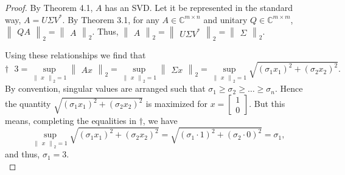 \documentclass{article}
\begin{document}
\begin{proof}
    By Theorem 4.1, $A$ has an SVD. Let it be represented in the standard way, $A = U \Sigma V^*$. By Theorem 3.1, for any $A \in \mathbb{C}^{m \times n}$ and unitary $Q \in \mathbb{C}^{m \times m}$,
    $\begin{Vmatrix}
        QA
    \end{Vmatrix}_2 
    = 
    \begin{Vmatrix}
        A
    \end{Vmatrix}_2.$
    Thus, 
    $\begin{Vmatrix}
        A
    \end{Vmatrix}_2
    =
    \begin{Vmatrix}
        U\Sigma V^*
    \end{Vmatrix}_2
    =
    \begin{Vmatrix}
        \Sigma
    \end{Vmatrix}_2.$
    
    Using these relationships we find that  
    \[  
        \dagger ~~~
        3 = \sup_{\begin{Vmatrix}x\end{Vmatrix}_2 = 1}
        \begin{Vmatrix}
            Ax
        \end{Vmatrix}_2 = 
        \sup_{\begin{Vmatrix}x\end{Vmatrix}_2 = 1} 
        \begin{Vmatrix}
            \Sigma x
        \end{Vmatrix}_2
        =
        \sup_{\begin{Vmatrix}x\end{Vmatrix}_2 = 1} \sqrt{(\sigma_1 x_1)^2 + (\sigma_2 x_2)^2}.
    \] 
    By convention, singular values are arranged such that $\sigma_1 \geq \sigma_2 \geq \dots \geq \sigma_n$. Hence the quantity $\sqrt{(\sigma_1 x_1)^2 + (\sigma_2 x_2)^2}$ is maximized for $x = \begin{bmatrix}
        1\\ 0
    \end{bmatrix}$. But this means, completing the equalities in $\dagger$, we have \[\sup_{\begin{Vmatrix}x\end{Vmatrix}_2 = 1} \sqrt{(\sigma_1 x_1)^2 + (\sigma_2 x_2)^2} = \sqrt{(\sigma_1 \cdot 1)^2 + (\sigma_2 \cdot 0)^2} = \sigma_1,\] and thus, $\sigma_1 = 3$.\\
    

\end{proof}
\end{document}

